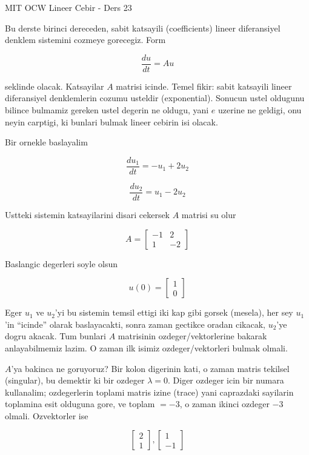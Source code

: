 \documentclass[12pt,fleqn]{article}
\begin{document}
MIT OCW Lineer Cebir - Ders 23

Bu derste birinci dereceden, sabit katsayili (coefficients) lineer
diferansiyel denklem sistemini cozmeye gorecegiz. Form

\[ \frac{du}{dt} = A u \]

seklinde olacak. Katsayilar $A$ matrisi icinde. Temel fikir: sabit katsayili
lineer diferansiyel denklemlerin cozumu usteldir (exponential). Sonucun
ustel oldugunu bilince bulmamiz gereken ustel degerin ne oldugu, yani $e$
uzerine ne geldigi, onu neyin carptigi, ki bunlari bulmak lineer cebirin
isi olacak.

Bir ornekle baslayalim

\[ \frac{du_1}{dt} = -u_1 + 2u_2 \]

\[ \frac{du_2}{dt} = u_1 - 2u_2 \]

Ustteki sistemin katsayilarini disari cekersek $A$ matrisi su olur

\[ A = 
\left[\begin{array}{cc}
-1 & 2 \\
1 & -2
\end{array}\right]
 \]

Baslangic degerleri soyle olsun

\[ u(0) = 
\left[\begin{array}{c}
1 \\
0
\end{array}\right]
 \]

Eger $u_1$ ve $u_2$'yi bu sistemin temsil ettigi iki kap gibi gorsek
(mesela), her sey $u_1$'in ``icinde'' olarak baslayacakti, sonra zaman
gectikce oradan cikacak, $u_2$'ye dogru akacak. Tum bunlari $A$ matrisinin
ozdeger/vektorlerine bakarak anlayabilmemiz lazim. O zaman ilk isimiz
ozdeger/vektorleri bulmak olmali. 

$A$'ya bakinca ne goruyoruz? Bir kolon digerinin kati, o zaman matris
tekilsel (singular), bu demektir ki bir ozdeger $\lambda = 0$. Diger
ozdeger icin bir numara kullanalim; ozdegerlerin toplami matris izine
(trace) yani caprazdaki sayilarin toplamina esit olduguna gore, ve toplam
$=-3$, o zaman ikinci ozdeger $-3$ olmali. Ozvektorler ise

\[ 
\left[\begin{array}{c}
2 \\ 1
\end{array}\right] 
,
\left[\begin{array}{c}
1 \\ -1
\end{array}\right]
 \]
\end{document}
